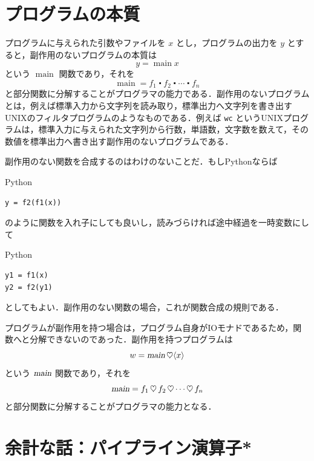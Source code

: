 \documentclass[a4paper,twocolumn]{jsbook}
\newcommand{\programminglanguage}[1]{\textsf{#1}}
\newcommand{\python}{\programminglanguage{Python}}
\newcommand{\code}[1]{\texttt{#1}}
\newenvironment{pythoncode}{\begin{itembox}[r]{\python}}{\end{itembox}}
\DeclareMathOperator{\mMainFunc}{main}
\newcommand{\mAction}[1]{\textsl{#1}}
\DeclareMathOperator{\mMain}{\mAction{main}}
\DeclareMathOperator{\mBind}{\heartsuit}
\DeclareMathOperator{\mComp}{\centerdot}
\newcommand{\mPureWith}[1]{\langle#1\rangle}
\begin{document}
\section{プログラムの本質}

プログラムに与えられた引数やファイルを $x$ とし，プログラムの出力を $y$ とすると，副作用のないプログラムの本質は
\begin{equation}
y=\mMainFunc x
\end{equation}
という $\mMainFunc$ 関数であり，それを
\begin{equation}
\mMainFunc=f_1\mComp f_2\mComp\dotsb\mComp f_n
\end{equation}
と部分関数に分解することがプログラマの能力である．副作用のないプログラムとは，例えば標準入力から文字列を読み取り，標準出力へ文字列を書き出すUNIXのフィルタプログラムのようなものである．例えば \code{wc} というUNIXプログラムは，標準入力に与えられた文字列から行数，単語数，文字数を数えて，その数値を標準出力へ書き出す副作用のないプログラムである．

副作用のない関数を合成するのはわけのないことだ．もし\python ならば
\begin{pythoncode}
\begin{verbatim}
y = f2(f1(x))
\end{verbatim}
\end{pythoncode}
のように関数を入れ子にしても良いし，読みづらければ途中経過を一時変数にして
\begin{pythoncode}
\begin{verbatim}
y1 = f1(x)
y2 = f2(y1)
\end{verbatim}
\end{pythoncode}
としてもよい．副作用のない関数の場合，これが関数合成の規則である．

プログラムが副作用を持つ場合は，プログラム自身がIOモナドであるため，関数へと分解できないのであった．副作用を持つプログラムは
\begin{equation}
w=\mMain\mBind\mPureWith{x}
\end{equation}
という $\mMain$ 関数であり，それを
\begin{equation}
\mMain=f_1\mBind f_2\mBind\dotsb\mBind f_n  %
\end{equation}
と部分関数に分解することがプログラマの能力となる．


\section{余計な話：パイプライン演算子*}
\end{document}
